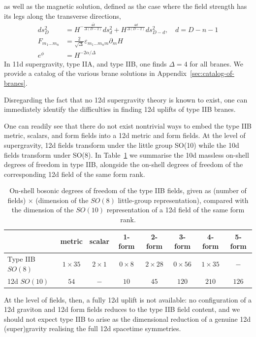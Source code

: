as well as the magnetic solution, defined as the case where the field strength has its legs along the transverse directions,
\begin{equation}
\begin{aligned}
ds_D^2
&=H^{-\frac{4\tilde d}{\Delta(D-2)}}ds_{d}^2+
H^{\frac{4d}{\Delta(D-2)}}ds_{D-d}^2,\quad
d = D-n-1\\
F_{m_1...m_n}
&= \frac{2}{\sqrt{\Delta}}\varepsilon_{m_1...m_n m}\partial_m H\\
e^\phi &= H^{-2\alpha/\Delta}
\end{aligned}
\end{equation}
In 11d supergravity, type IIA, and type IIB, one finds $\Delta = 4$ for all branes.
We provide a catalog of the various brane solutions in Appendix~\ref{sec:catalog-of-branes}.

Disregarding the fact that no 12d supergravity theory is known to exist, one can immediately identify the difficulties in finding 12d uplifts of type IIB branes.

One can readily see that there do not exist nontrivial ways to embed the type IIB metric, scalars, and form fields into a 12d metric and form fields.
At the level of supergravity, 12d fields transform under the little group SO(10) while the 10d fields transform under SO(8).
In Table~\ref{tab:10d-12d-dof} we summarise the 10d massless on-shell degrees of freedom in type IIB, alongside the on-shell degrees of freedom of the corresponding 12d field of the same form rank.

\begin{table}[h]
\centering
\begin{tabular}{l|ccccccc}
\hline
 & metric & scalar & 1-form & 2-form & 3-form & 4-form & 5-form \\
\hline
Type IIB $SO(8)$ & $1\times 35$ & $2\times 1$ & $0\times 8$ & $2\times 28$ & $0\times 56$ & $1\times 35$ & $-$ \\
12d $SO(10)$ & $54$ & $-$ & $10$ & $45$ & $120$ & $210$ & $126$ \\
\hline
\end{tabular}
\caption{
On-shell bosonic degrees of freedom of the type IIB fields, given as (number of fields) $\times$ (dimension of the $SO(8)$ little-group representation), compared with the dimension of the $SO(10)$ representation of a 12d field of the same form rank.
}
\label{tab:10d-12d-dof}
\end{table}

At the level of fields, then, a fully 12d uplift is not available: no configuration of a 12d graviton and 12d form fields reduces to the type IIB field content, and we should not expect type IIB to arise as the dimensional reduction of a genuine 12d (super)gravity realising the full 12d spacetime symmetries.

